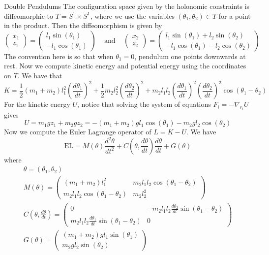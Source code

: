 \documentclass[a4paper]{article}
\begin{document}
\begin{eg}{Double Pendulums}{}
The configuration space given by the holonomic constraints is diffeomorphic to $T=S^1\times S^1$, where we use the variables $(\theta_1,\theta_2)\in T$ for a point in the product. Then the diffeomorphism is given by $$\begin{pmatrix}
x_1\\z_1
\end{pmatrix}=\begin{pmatrix}
l_1\sin(\theta_1)\\
-l_1\cos(\theta_1)
\end{pmatrix}\;\;\;\text{ and }\;\;\;\begin{pmatrix}
x_2\\z_2
\end{pmatrix}=\begin{pmatrix}
l_1\sin(\theta_1)+l_2\sin(\theta_2)\\
-l_1\cos(\theta_1)-l_2\cos(\theta_2)
\end{pmatrix}$$ The convention here is so that when $\theta_1=0$, pendulum one points downwards at rest. Now we compute kinetic energy and potential energy using the coordinates on $T$. We have that $$K=\frac{1}{2}(m_1+m_2)l_1^2\left(\frac{d\theta_1}{dt}\right)^2+\frac{1}{2}m_2l_2^2\left(\frac{d\theta_2}{dt}\right)^2+m_2l_1l_2\left(\frac{d\theta_1}{dt}\right)^2\left(\frac{d\theta_2}{dt}\right)^2\cos(\theta_1-\theta_2)$$ For the kinetic energy $U$, notice that solving the system of equations $F_i=-\nabla_{r_i}U$ gives $$U=m_1gz_1+m_2gz_2=-(m_1+m_2)gl_1\cos(\theta_1)-m_2gl_2\cos(\theta_2)$$ Now we compute the Euler Lagrange operator of $L=K-U$. We have $$\text{EL}=M(\theta)\frac{d^2\theta}{dt^2}+C\left(\theta,\frac{d\theta}{dt}\right)\frac{d\theta}{dt}+G(\theta)$$ where 
\begin{gather*}
\theta=(\theta_1,\theta_2)\\
M(\theta)=\begin{pmatrix}
(m_1+m_2)l_1^2 & m_2l_1l_2\cos(\theta_1-\theta_2)\\
m_2l_1l_2\cos(\theta_1-\theta_2) & m_2l_2^2
\end{pmatrix}\\
C\left(\theta,\frac{d\theta}{dt}\right)=\begin{pmatrix}
0 & -m_2l_1l_2\frac{d\theta_2}{dt}\sin(\theta_1-\theta_2)\\
m_2l_1l_2\frac{d\theta_1}{dt}\sin(\theta_1-\theta_2) & 0
\end{pmatrix}\\
G(\theta)=\begin{pmatrix}
(m_1+m_2)gl_1\sin(\theta_1)\\
m_2gl_2\sin(\theta_2)
\end{pmatrix}
\end{gather*}
\end{eg}
\end{document}
